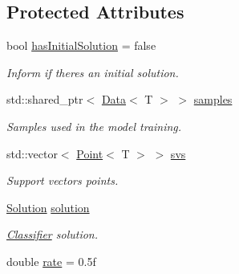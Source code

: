 \subsection*{Protected Attributes}
\begin{DoxyCompactItemize}
\item 
\mbox{\label{class_classifier_a914e488b477b9237cf991ff0b485c6c7}} 
bool \mbox{\hyperlink{class_classifier_a914e488b477b9237cf991ff0b485c6c7}{has\+Initial\+Solution}} = false
\begin{DoxyCompactList}\small\item\em Inform if there\textquotesingle{}s an initial solution. \end{DoxyCompactList}\item 
\mbox{\label{class_classifier_a0000b47a2e0784ada4c52d7046c4adb8}} 
std\+::shared\+\_\+ptr$<$ \mbox{\hyperlink{class_data}{Data}}$<$ T $>$ $>$ \mbox{\hyperlink{class_classifier_a0000b47a2e0784ada4c52d7046c4adb8}{samples}}
\begin{DoxyCompactList}\small\item\em Samples used in the model training. \end{DoxyCompactList}\item 
\mbox{\label{class_classifier_ae8695222e93f7fea1a1e585d4c126f7d}} 
std\+::vector$<$ \mbox{\hyperlink{class_point}{Point}}$<$ T $>$ $>$ \mbox{\hyperlink{class_classifier_ae8695222e93f7fea1a1e585d4c126f7d}{svs}}
\begin{DoxyCompactList}\small\item\em Support vectors points. \end{DoxyCompactList}\item 
\mbox{\label{class_classifier_adecdc97505c2911a66e240ad0fefd9ea}} 
\mbox{\hyperlink{class_solution}{Solution}} \mbox{\hyperlink{class_classifier_adecdc97505c2911a66e240ad0fefd9ea}{solution}}
\begin{DoxyCompactList}\small\item\em \mbox{\hyperlink{class_classifier}{Classifier}} solution. \end{DoxyCompactList}\item 
\mbox{\label{class_classifier_a7b1c4ef87631bd9e46682e5bc4315111}} 
double \mbox{\hyperlink{class_classifier_a7b1c4ef87631bd9e46682e5bc4315111}{rate}} = 0.\+5f

\end{DoxyCompactItemize}
